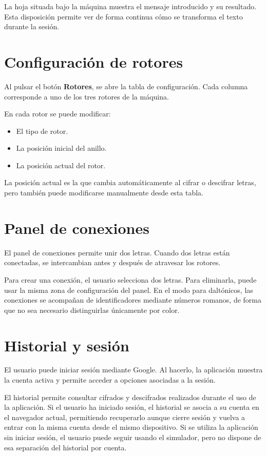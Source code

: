 La hoja situada bajo la máquina muestra el mensaje introducido y su resultado. Esta disposición permite ver de forma continua cómo se transforma el texto durante la sesión.

\section{Configuración de rotores}

Al pulsar el botón \textbf{Rotores}, se abre la tabla de configuración. Cada columna corresponde a uno de los tres rotores de la máquina.

En cada rotor se puede modificar:

\begin{itemize}
	\item El tipo de rotor.
	\item La posición inicial del anillo.
	\item La posición actual del rotor.
\end{itemize}

La posición actual es la que cambia automáticamente al cifrar o descifrar letras, pero también puede modificarse manualmente desde esta tabla.

\section{Panel de conexiones}

El panel de conexiones permite unir dos letras. Cuando dos letras están conectadas, se intercambian antes y después de atravesar los rotores.

Para crear una conexión, el usuario selecciona dos letras. Para eliminarla, puede usar la misma zona de configuración del panel. En el modo para daltónicos, las conexiones se acompañan de identificadores mediante números romanos, de forma que no sea necesario distinguirlas únicamente por color.

\section{Historial y sesión}

El usuario puede iniciar sesión mediante Google. Al hacerlo, la aplicación muestra la cuenta activa y permite acceder a opciones asociadas a la sesión.

El historial permite consultar cifrados y descifrados realizados durante el uso de la aplicación. Si el usuario ha iniciado sesión, el historial se asocia a su cuenta en el navegador actual, permitiendo recuperarlo aunque cierre sesión y vuelva a entrar con la misma cuenta desde el mismo dispositivo. Si se utiliza la aplicación sin iniciar sesión, el usuario puede seguir usando el simulador, pero no dispone de esa separación del historial por cuenta.

